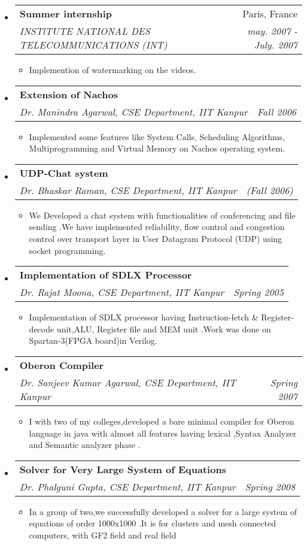 \documentclass[letterpaper,11pt]{article}
\makeatletter
\newcommand{\resitem}[1]{\item #1 \vspace{-2pt}}
\newcommand{\resheading}[1]{{\large \parashade[.9]{sharpcorners}{\textbf{#1 \vphantom{p\^{E}}}}}}
\newcommand{\ressubheading}[4]{
\begin{tabular*}{6.5in}{l@{\extracolsep{\fill}}r}
		\textbf{#1} & #2 \\
		\textit{#3} & \textit{#4} \\
\end{tabular*}\vspace{-6pt}}
\makeatother
\begin{document}
\newpage

\resheading{Projects}
\begin{itemize}
\item
\ressubheading{Summer internship}{Paris, France}{INSTlTUTE NATIONAL DES TELECOMMUNICATIONS (INT) }{may. 2007 - July. 2007}
		\begin{itemize}
		\resitem{Implemention of  watermarking on the videos. }
		\end{itemize}
		
\item
	\ressubheading{Extension of Nachos}{}{Dr. Manindra Agarwal, CSE Department, IIT Kanpur}{Fall 2006}	
		\begin{itemize}
		\resitem{Implemented some features like System Calls, Scheduling Algorithms, Multiprogramming and Virtual Memory on Nachos  operating system.}
		\end{itemize}
	
\item
	\ressubheading{UDP-Chat system}{}{ Dr. Bhaskar Raman, CSE Department, IIT Kanpur}{(Fall 2006)}	
		\begin{itemize}
		\resitem{We Developed a chat system with functionalities of conferencing and file sending .We have implemented reliability, flow control and congestion control over transport layer in User Datagram Protocol (UDP) using socket programming.}
		\end{itemize}
	
\item
	\ressubheading{Implementation of SDLX Processor}{}{Dr. Rajat Moona, CSE Department, IIT Kanpur}{Spring 2005}	
		\begin{itemize}
		\resitem{Implementation of SDLX processor having Instruction-fetch \& Register-decode unit,ALU, Register file and MEM unit .Work was done on Spartan-3(FPGA board)in Verilog.}
	
		\end{itemize}

\item
	\ressubheading{Oberon Compiler}{}{Dr. Sanjeev Kumar Agarwal, CSE Department, IIT Kanpur}{Spring 2007}	
		\begin{itemize}
		\resitem{ I with two of my colleges,developed a bare minimal compiler for Oberon language in java with almost all  features having  lexical ,Syntax Analyzer and  Semantic analyzer phase .}
		\end{itemize}		
		
	
		\item
	\ressubheading{Solver for Very Large System of Equations}{}{Dr. Phalguni Gupta,  CSE Department, IIT Kanpur}{Spring 2008}	
		\begin{itemize}
		\resitem{In a group of two,we  successfully developed a solver for a large system of equations of order 1000x1000 .It is for clusters and mesh connected computers, with GF2 field and  real field }
		

\end{itemize}
\end{itemize}
\end{document}
